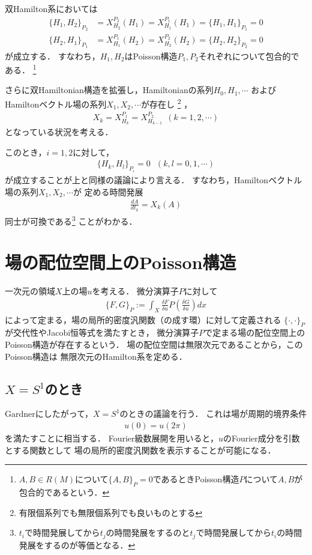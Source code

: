 \documentclass[dvipdfmx,12pt,a4paper,uplatex]{jsarticle}
\theoremstyle{plain}
\theoremstyle{definition}
\begin{document}
双Hamilton系においては
\begin{align}
\{H_1,H_2\}_{P_2} &= X^{P_2}_{H_2}(H_1)= X^{P_1}_{H_1}(H_1) =
\{H_1,H_1\}_{P_1} = 0 \nonumber \\
\{H_2,H_1\}_{P_1} &= X^{P_1}_{H_1}(H_2)= X^{P_2}_{H_2}(H_2) =
\{H_2,H_2\}_{P_2} = 0
\end{align}
が成立する．
すなわち，$H_1,H_2$はPoisson構造$P_1,P_2$それぞれについて包合的である．
\footnote{$A,B\in R(M)$について$\{A,B\}_{P} = 0$であるときPoisson構造$P$について$A,B$が包合的であるという．}

さらに双Hamiltonian構造を拡張し，Hamiltonianの系列$H_0,H_1,\cdots$
およびHamiltonベクトル場の系列$X_1,X_2,\cdots$が存在し
\footnote{有限個系列でも無限個系列でも良いものとする}
，
\begin{align}
X_k = X_{H_k}^{P_1} = X_{H_{k-1}}^{P_2} \ \ (k=1,2,\cdots)
\end{align}
となっている状況を考える．

このとき，$i=1,2$に対して，
\begin{align}
\{H_{k},H_{l}\}_{P_i} = 0 \ \ \ (k,l=0,1,\cdots)
\end{align}
が成立することが上と同様の議論により言える．
すなわち，Hamiltonベクトル場の系列$X_1,X_2,\cdots$が
定める時間発展
\begin{align}
\frac{dA}{dt_k} = X_k(A)
\end{align}
同士が可換である\footnote{$t_i$で時間発展してから$t_j$の時間発展をするのと$t_j$で時間発展してから$t_i$の時間発展をするのが等価となる．}
ことがわかる．

\section{場の配位空間上のPoisson構造}
一次元の領域$X$上の場$u$を考える．
微分演算子$P$に対して
\begin{align}
\{F,G\}_P 
:= \int_X \frac{\delta F}{\delta u} 
P\left(\frac{\delta G}{\delta u} \right) dx
\end{align}
によって定まる，場の局所的密度汎関数（の成す環）に対して定義される
$\{\cdot ,\cdot\}_P$が交代性やJacobi恒等式を満たすとき，
微分演算子$P$で定まる場の配位空間上のPoisson構造が存在するという．
場の配位空間は無限次元であることから，このPoisson構造は
無限次元のHamilton系を定める．

\subsection{$X=S^1$のとき}
Gardner\cite{Gardner}にしたがって，$X=S^1$のときの議論を行う．
これは場が周期的境界条件
\begin{align}
u(0)=u(2\pi)
\end{align}
を満たすことに相当する．
Fourier級数展開を用いると，$u$のFourier成分を引数とする関数として
場の局所的密度汎関数を表示することが可能になる．
\end{document}
